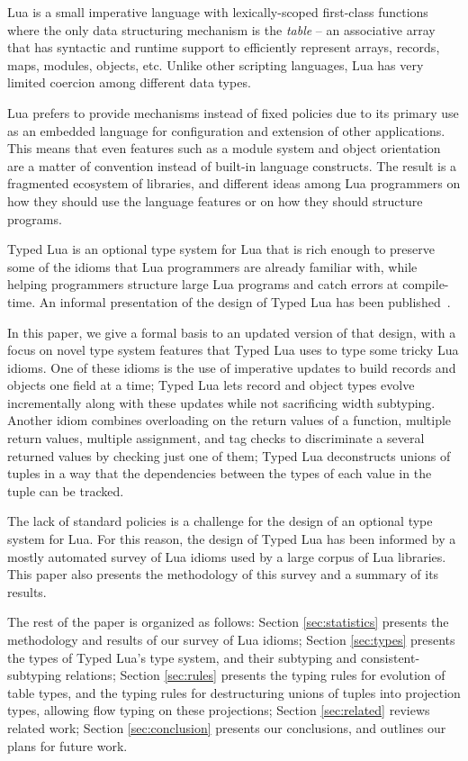 \documentclass{sigplanconf}
\begin{document}
Lua is a small imperative language with lexically-scoped first-class functions where the only data structuring
mechanism is the \emph{table} --
an associative array that has syntactic and runtime support
to efficiently represent arrays, records, maps, modules,
objects, etc. Unlike other scripting languages, Lua has very limited coercion among different data types.

Lua prefers to provide mechanisms instead of fixed policies due
to its primary use as an embedded language for configuration and
extension of other applications.
This means that even features such as a module system and
object orientation are a matter of convention instead of
built-in language constructs.
The result is a fragmented ecosystem of libraries, and different
ideas among Lua programmers on how they should use the language
features or on how they should structure programs.

Typed Lua is an optional type system for
Lua that is rich enough to preserve some of the idioms
that Lua programmers are already familiar with, while
helping programmers structure large Lua programs and
catch errors at compile-time. An informal
presentation of the design of Typed Lua has been
published~\cite{maidl2014tl}.

In this paper, we give a formal basis to an updated version of that design, with a focus on novel type system features
that Typed Lua uses to type some tricky Lua idioms.
One of these idioms is the use of imperative updates to
build records and objects one field at a time; Typed Lua
lets record and object types evolve incrementally along
with these updates while not sacrificing width subtyping.
Another idiom combines overloading on the return values
of a function, multiple return values, multiple assignment,
and tag checks to discriminate a several returned values
by checking just one of them; Typed Lua deconstructs unions
of tuples in a way that the dependencies between the types
of each value in the tuple can be tracked.

The lack of standard policies is a challenge for the design of
an optional type system for Lua. For this reason, the design
of Typed Lua has been informed by a mostly automated survey
of Lua idioms used by a large corpus of Lua libraries.
This paper also presents the methodology of this survey and
a summary of its results.

The rest of the paper is organized as follows:
Section \ref{sec:statistics} presents the methodology and results of
our survey of Lua idioms;
Section \ref{sec:types} presents the types of Typed Lua's
type system, and their subtyping and consistent-subtyping relations;
Section \ref{sec:rules} presents the typing rules for evolution of table types,
and the typing rules for destructuring unions of tuples into projection types,
allowing flow typing on these projections;
Section \ref{sec:related} reviews related work;
Section \ref{sec:conclusion} presents our conclusions,
and outlines our plans for future work.
\end{document}
